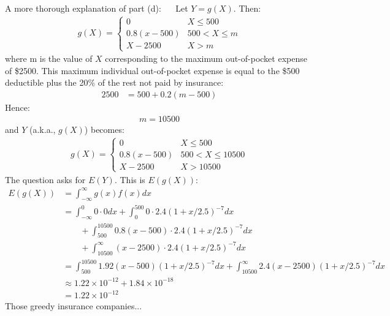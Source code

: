 \documentclass{article}\usepackage{graphicx, color}
\providecommand{\q}{$\quad$ \newline}
\numberwithin{equation}{section}
\begin{document}
\begin{flushleft}
\begin{enumerate}[1. ]
\color{red}
A more thorough explanation of part (d): \q
Let $Y = g(X)$. Then:
\begin{align*}
g(X) = \begin{cases}
0 & X \le 500 \\
0.8(x - 500) & 500 < X \le m \\
X - 2500 & X > m
\end{cases} 
\end{align*}
where m is the value of $X$ corresponding to the maximum out-of-pocket expense of \$2500. This maximum individual  out-of-pocket expense is equal to the \$500 deductible plus the 20\% of the rest not paid by insurance:
\begin{align*}
2500 &= 500 + 0.2(m - 500)
\end{align*}
Hence:
\begin{align*}
m = 10500
\end{align*}
and $Y$ (a.k.a., $g(X)$) becomes:
\begin{align*}
g(X) = \begin{cases}
0 & X \le 500 \\
0.8(x - 500) &500 <  X \le 10500 \\
X - 2500 & X > 10500
\end{cases} 
\end{align*}
The question asks for $E(Y)$. This is $E(g(X))$:
\begin{align*}
E(g(X)) &= \int_{-\infty}^\infty g(x)f(x) dx \\
&= \int_{-\infty}^0 0 \cdot 0 dx + \int_0^{500} 0 \cdot 2.4(1 + x/2.5)^{-7} dx \\
& \qquad + \int_{500}^{10500} 0.8(x - 500) \cdot 2.4(1 + x/2.5)^{-7}dx \\
& \qquad + \int_{10500}^\infty (x - 2500)\cdot 2.4(1 + x/2.5)^{-7} dx \\
&= \int_{500}^{10500} 1.92(x - 500)(1 + x/2.5)^{-7}dx + \int_{10500}^\infty 2.4 (x-2500) (1 + x/2.5)^{-7} dx \\
&\approx 1.22 \times 10^{-12} + 1.84 \times 10^{-18} \\
&= 1.22 \times 10^{-12}
\end{align*}
Those greedy insurance companies...
\color{black}


\end{enumerate}
\end{flushleft}
\end{document}
